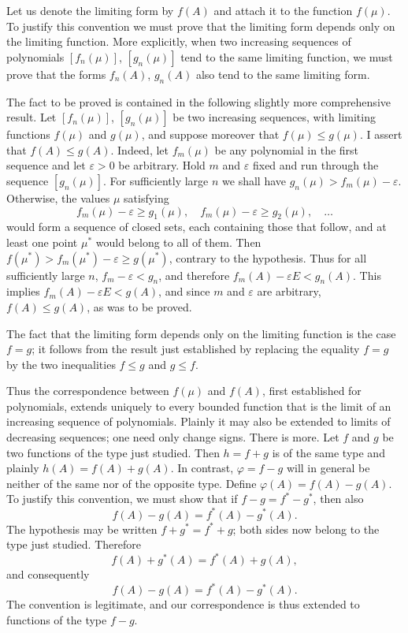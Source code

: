 \documentclass[
  paper=b5,
  fontsize=13pt,
  twoside=true,
  open=any,
  bookmarkpackage=false,
  chapterprefix=true,
  headings=normal
]{scrbook}
\theoremstyle{definition}
\begin{document}
Let us denote the limiting form by \(f(A)\) and attach it to the function
\(f(\mu)\).  To justify this convention we must prove that the limiting form
depends only on the limiting function.  More explicitly, when two increasing
sequences of polynomials \([f_n(\mu)]\), \([g_n(\mu)]\) tend to the same limiting
function, we must prove that the forms \(f_n(A)\), \(g_n(A)\) also tend to the
same limiting form.

The fact to be proved is contained in the following slightly more comprehensive
result.  Let \([f_n(\mu)]\), \([g_n(\mu)]\) be two increasing sequences, with
limiting functions \(f(\mu)\) and \(g(\mu)\), and suppose moreover that
\(f(\mu)\le g(\mu)\).  I assert that \(f(A)\le g(A)\).  Indeed, let
\(f_m(\mu)\) be any polynomial in the first sequence and let \(\varepsilon>0\)
be arbitrary.  Hold \(m\) and \(\varepsilon\) fixed and run through the sequence
\([g_n(\mu)]\).  For sufficiently large \(n\) we shall have
\(g_n(\mu)>f_m(\mu)-\varepsilon\).  Otherwise, the values \(\mu\) satisfying
\[
 f_m(\mu)-\varepsilon\ge g_1(\mu),\quad
 f_m(\mu)-\varepsilon\ge g_2(\mu),\quad\ldots
\]
would form a sequence of closed sets, each containing those that follow, and at
least one point \(\mu^*\) would belong to all of them.  Then
\(f(\mu^*)>f_m(\mu^*)-\varepsilon\ge g(\mu^*)\), contrary to the hypothesis.
Thus for all sufficiently large \(n\), \(f_m-\varepsilon<g_n\), and therefore
\(f_m(A)-\varepsilon E<g_n(A)\).  This implies
\(f_m(A)-\varepsilon E<g(A)\), and since \(m\) and \(\varepsilon\) are
arbitrary, \(f(A)\le g(A)\), as was to be proved.

The fact that the limiting form depends only on the limiting function is the
case \(f=g\); it follows from the result just established by replacing the
equality \(f=g\) by the two inequalities \(f\le g\) and \(g\le f\).

Thus the correspondence between \(f(\mu)\) and \(f(A)\), first established for
polynomials, extends uniquely to every bounded function that is the limit of an
increasing sequence of polynomials.  Plainly it may also be extended to limits
of decreasing sequences; one need only
change signs.  There is more.  Let \(f\) and \(g\) be two functions of the type
just studied.  Then \(h=f+g\) is of the same type and plainly
\(h(A)=f(A)+g(A)\).  In contrast, \(\varphi=f-g\) will in general be neither of
the same nor of the opposite type.  Define
\(\varphi(A)=f(A)-g(A)\).  To justify this convention, we must show that if
\(f-g=f^*-g^*\), then also
\[
  f(A)-g(A)=f^*(A)-g^*(A).
\]
The hypothesis may be written \(f+g^*=f^*+g\); both sides now belong to the type
just studied.  Therefore
\[
  f(A)+g^*(A)=f^*(A)+g(A),
\]
and consequently
\[
  f(A)-g(A)=f^*(A)-g^*(A).
\]
The convention is legitimate, and our correspondence is thus extended to
functions of the type \(f-g\).
\end{document}
